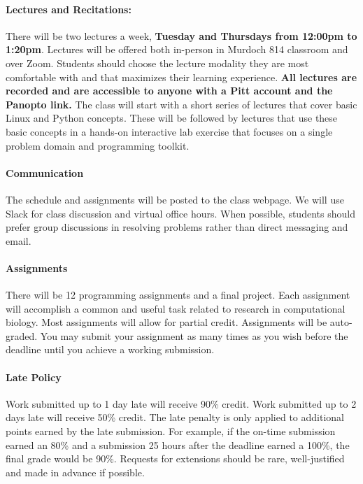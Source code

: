 \documentclass[11pt,letterpaper,oneside]{article}
\begin{document}
\paragraph*{Lectures and Recitations:}  
There will be two lectures a week, \textbf{Tuesday and Thursdays from 12:00pm to 1:20pm}. Lectures will be offered both in-person in Murdoch 814 classroom and over Zoom.  Students should choose the lecture modality they are most comfortable with and that maximizes their learning experience. \textbf{All lectures are recorded and are accessible to anyone with a Pitt account and the Panopto link.} The class will start with a short series of lectures that cover basic Linux and Python concepts. These will be followed by lectures that use these basic concepts in a hands-on interactive lab exercise that focuses on a single problem domain and programming toolkit. 

\paragraph*{Communication}
The schedule and assignments will be posted to the class webpage. We will use Slack for class discussion and virtual office hours.  When possible, students should prefer group discussions in resolving problems rather than direct messaging and email.


\paragraph*{Assignments}  There will be 12 programming assignments and a final project. Each assignment will accomplish a common and useful task related to research in computational biology. Most assignments will allow for partial credit.  Assignments will be auto-graded.  
You may submit your assignment as many times as you wish before the deadline until you achieve a working submission.  

\paragraph*{Late Policy} Work submitted up to 1 day late will receive 90\% credit.  Work submitted up to 2 days late will receive 50\% credit.  The late penalty is only applied to additional points earned by the late submission.  For example, if the on-time submission earned an 80\% and a submission 25 hours after the deadline earned a 100\%, the final grade would be 90\%. Requests for extensions should be rare, well-justified and made in advance if possible.
\end{document}
